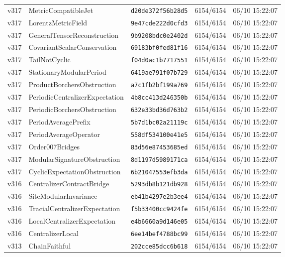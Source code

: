 \documentclass[11pt]{article}
\theoremstyle{definition}\newtheorem{deriv}{Derivation}
\begin{document}
{\begin{longtable}{@{}lllll@{}}
v317 & MetricCompatibleJet & \texttt{d20de372f56b28d5} & 6154/6154 & 06/10 15:22:07 \\
v317 & LorentzMetricField & \texttt{9e47cde222d0cfd3} & 6154/6154 & 06/10 15:22:07 \\
v317 & GeneralTensorReconstruction & \texttt{9b9208bdc0e2402d} & 6154/6154 & 06/10 15:22:07 \\
v317 & CovariantScalarConservation & \texttt{69183bf0fed81f16} & 6154/6154 & 06/10 15:22:07 \\
v317 & TailNotCyclic & \texttt{f04d0ac1b7717551} & 6154/6154 & 06/10 15:22:07 \\
v317 & StationaryModularPeriod & \texttt{6419ae791f07b729} & 6154/6154 & 06/10 15:22:07 \\
v317 & ProductBorchersObstruction & \texttt{a7c1fb2bf199a769} & 6154/6154 & 06/10 15:22:07 \\
v317 & PeriodicCentralizerExpectation & \texttt{4b8cc413d246350b} & 6154/6154 & 06/10 15:22:07 \\
v317 & PeriodicBorchersObstruction & \texttt{632e33bd36d763b2} & 6154/6154 & 06/10 15:22:07 \\
v317 & PeriodAveragePrefix & \texttt{5b7d1bc02a21119c} & 6154/6154 & 06/10 15:22:07 \\
v317 & PeriodAverageOperator & \texttt{558df534100e41e5} & 6154/6154 & 06/10 15:22:07 \\
v317 & Order007Bridges & \texttt{83d56e87453685ed} & 6154/6154 & 06/10 15:22:07 \\
v317 & ModularSignatureObstruction & \texttt{8d1197d5989171ca} & 6154/6154 & 06/10 15:22:07 \\
v317 & CyclicExpectationObstruction & \texttt{6b21047553efb3da} & 6154/6154 & 06/10 15:22:07 \\
v316 & CentralizerContractBridge & \texttt{5293db8b121db928} & 6154/6154 & 06/10 15:22:07 \\
v316 & SiteModularInvariance & \texttt{eb41b4297e2b3ee4} & 6154/6154 & 06/10 15:22:07 \\
v316 & TracialCentralizerExpectation & \texttt{f5b33400cc9424fe} & 6154/6154 & 06/10 15:22:07 \\
v316 & LocalCentralizerExpectation & \texttt{e4b6660a9d146e05} & 6154/6154 & 06/10 15:22:07 \\
v316 & CentralizerLocal & \texttt{6ee14bef4788bc99} & 6154/6154 & 06/10 15:22:07 \\
v313 & ChainFaithful & \texttt{202cce85dcc6b618} & 6154/6154 & 06/10 15:22:07 \\

\end{longtable}}
\end{document}
